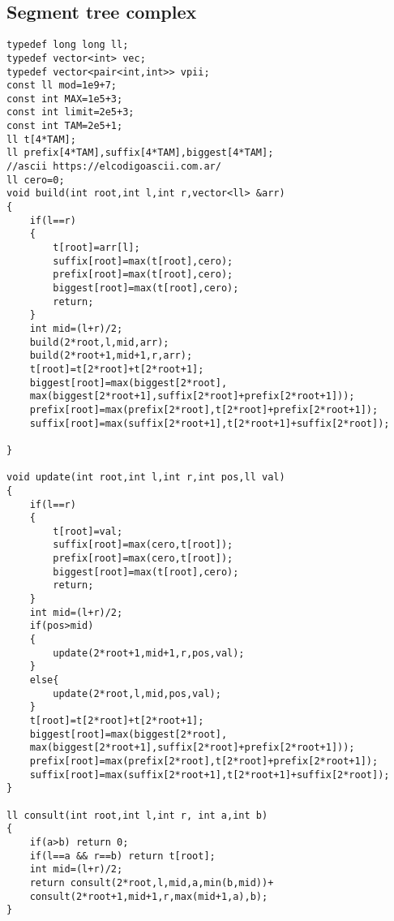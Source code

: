 \documentclass{article}
\begin{document}
\subsection{Segment tree complex}
\begin{lstlisting}
typedef long long ll;
typedef vector<int> vec;
typedef vector<pair<int,int>> vpii;
const ll mod=1e9+7;
const int MAX=1e5+3;
const int limit=2e5+3;
const int TAM=2e5+1;
ll t[4*TAM];
ll prefix[4*TAM],suffix[4*TAM],biggest[4*TAM];
//ascii https://elcodigoascii.com.ar/
ll cero=0;
void build(int root,int l,int r,vector<ll> &arr)
{
    if(l==r)
    {
        t[root]=arr[l];
        suffix[root]=max(t[root],cero);
        prefix[root]=max(t[root],cero);
        biggest[root]=max(t[root],cero);
        return;
    }
    int mid=(l+r)/2;
    build(2*root,l,mid,arr);
    build(2*root+1,mid+1,r,arr);
    t[root]=t[2*root]+t[2*root+1];
    biggest[root]=max(biggest[2*root],
    max(biggest[2*root+1],suffix[2*root]+prefix[2*root+1]));
    prefix[root]=max(prefix[2*root],t[2*root]+prefix[2*root+1]);
    suffix[root]=max(suffix[2*root+1],t[2*root+1]+suffix[2*root]);
    
}

void update(int root,int l,int r,int pos,ll val)
{
    if(l==r)
    {
        t[root]=val;
        suffix[root]=max(cero,t[root]);
        prefix[root]=max(cero,t[root]);
        biggest[root]=max(t[root],cero);
        return;
    }
    int mid=(l+r)/2;
    if(pos>mid)
    {
        update(2*root+1,mid+1,r,pos,val);
    }
    else{
        update(2*root,l,mid,pos,val);
    }
    t[root]=t[2*root]+t[2*root+1];
    biggest[root]=max(biggest[2*root],
    max(biggest[2*root+1],suffix[2*root]+prefix[2*root+1]));
    prefix[root]=max(prefix[2*root],t[2*root]+prefix[2*root+1]);
    suffix[root]=max(suffix[2*root+1],t[2*root+1]+suffix[2*root]);
}

ll consult(int root,int l,int r, int a,int b)
{
    if(a>b) return 0;
    if(l==a && r==b) return t[root];
    int mid=(l+r)/2;
    return consult(2*root,l,mid,a,min(b,mid))+
    consult(2*root+1,mid+1,r,max(mid+1,a),b);
}
\end{lstlisting}
\end{document}
